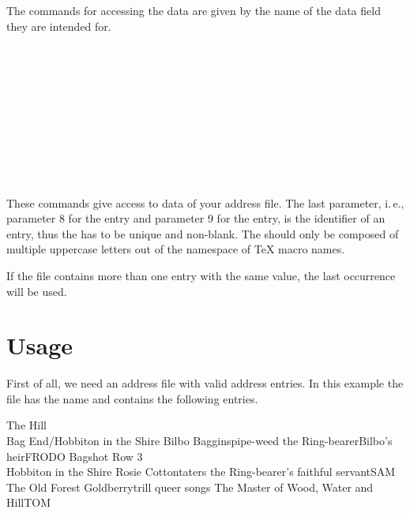 The commands for accessing the data are given by the name of the data
field they are intended for.
\begin{Declaration}
  \\
  \\
  \\
  \\
  \\
  \\
  \\
  \\
  \\
\end{Declaration}%
%
%
%
%
These commands give access to data of your address file.  The last
parameter, i.\,e., parameter 8 for the  entry and
parameter 9 for the  entry, is the identifier of an
entry, thus the  has to be unique and non-blank. The
 should only be composed of multiple uppercase letters out of the
namespace of \TeX{} macro names.

If the file contains more than one entry with the same 
value, the last occurrence will be used.%
%
%
%
%
%
%


\section{Usage}\label{sec:scraddr.usage}

First of all, we need an address file with valid address entries.  In
this example the file has the name  and contains the
following entries.
\begin{lstcode}
            {The Hill\\ Bag End/Hobbiton in the Shire}{}%
            {Bilbo Baggins}{pipe-weed}%
            {the Ring-bearer}{Bilbo's heir}{FRODO}
            {Bagshot Row 3\\Hobbiton in the Shire}{}%
            {Rosie Cotton}{taters}%
            {the Ring-bearer's faithful servant}{SAM}
            {The Old Forest}{}%
            {Goldberry}{trill queer songs}%
            {The Master of Wood, Water and Hill}{TOM}
\end{lstcode}

